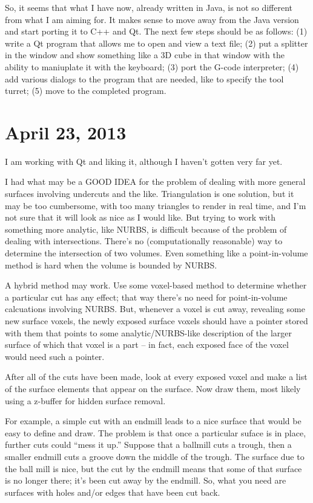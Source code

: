 \documentclass[titlepage,oneside,10pt]{article}
\begin{document}
So, it seems that what I have now, already written in Java, is not so
different from what I am aiming for. It makes sense to move away from
the Java version and start porting it to C++ and Qt. The next few
steps should be as follows: (1) write a Qt program that allows me to
open and view a text file; (2) put a splitter in the window and show
something like a 3D cube in that window with the ability to maniuplate
it with the keyboard; (3) port the G-code interpreter; (4) add various
dialogs to the program that are needed, like to specify the tool
turret; (5) move to the completed program.

\section{April 23, 2013}

I am working with Qt and liking it, although I haven't gotten very far
yet.

I had what may be a GOOD IDEA for the problem of dealing with more
general surfaces involving undercuts and the like. Triangulation is
one solution, but it may be too cumbersome, with too many triangles to
render in real time, and I'm not sure that it will look as nice as I
would like. But trying to work with something more analytic, like
NURBS, is difficult because of the problem of dealing with
intersections. There's no (computationally reasonable) way to
determine the intersection of two volumes. Even something like a
point-in-volume method is hard when the volume is bounded by NURBS. 

A hybrid method may work. Use some voxel-based method to determine
whether a particular cut has any effect; that way there's no need for
point-in-volume calcuations involving NURBS. But, whenever a voxel is cut
away, revealing some new surface voxels, the newly exposed surface
voxels should have a pointer stored with them that points to some
analytic/NURBS-like description of the larger surface of which that
voxel is a part -- in fact, each exposed face of the voxel would need
such a pointer.

After all of the cuts have been made, look at every exposed voxel and
make a list of the surface elements that appear on the
surface. Now draw them, most likely using a z-buffer for hidden
surface removal. 

For example, a simple cut with an endmill leads to a nice surface that
would be easy to define and draw. The problem is that once a
particular suface is in place, further cuts could ``mess it up.''
Suppose that a ballmill cuts a trough, then a smaller endmill cuts a
groove down the middle of the trough. The surface due to the ball mill
is nice, but the cut by the endmill means that some of that surface is
no longer there; it's been cut away by the endmill. So, what you need
are surfaces with holes and/or edges that have been cut back.
\end{document}

